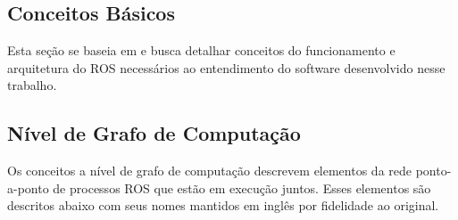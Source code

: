 \subsection{Conceitos Básicos}
Esta seção se baseia em \cite{ros_concepts} e busca detalhar conceitos do funcionamento e arquitetura do ROS necessários ao entendimento do software desenvolvido nesse trabalho. 


\subsection{Nível de Grafo de Computação}
Os conceitos a nível de grafo de computação descrevem elementos da rede ponto-a-ponto de processos ROS que estão em execução juntos. Esses elementos são descritos abaixo com seus nomes mantidos em inglês por fidelidade ao original.
